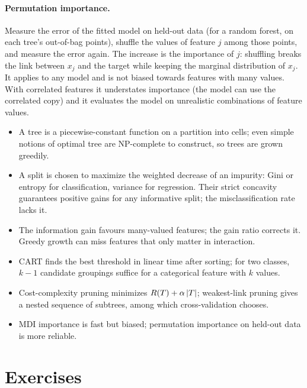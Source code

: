 \begin{notechapter}
\paragraph{Permutation importance.} Measure the error of the fitted model on held-out
data (for a random forest, on each tree's out-of-bag points), shuffle the values of
feature $j$ among those points, and measure the error again. The increase is the
importance of $j$: shuffling breaks the link between $x_j$ and the target while keeping the
marginal distribution of $x_j$. It applies to any model and is not biased towards
features with many values. With correlated features it understates importance (the
model can use the correlated copy) and it evaluates the model on unrealistic
combinations of feature values.

\begin{chaptersummary}
\begin{itemize}[nosep]
  \item A tree is a piecewise-constant function on a partition into cells; even simple notions of
        optimal tree are NP-complete to construct, so trees are grown greedily.
  \item A split is chosen to maximize the weighted decrease of an impurity: Gini or entropy
        for classification, variance for regression. Their strict concavity guarantees
        positive gains for any informative split; the misclassification rate lacks it.
  \item The information gain favours many-valued features; the gain ratio corrects it.
        Greedy growth can miss features that only matter in interaction.
  \item CART finds the best threshold in linear time after sorting; for two classes, $k - 1$
        candidate groupings suffice for a categorical feature with $k$ values.
  \item Cost-complexity pruning minimizes $R(T) + \alpha\left|T\right|$; weakest-link pruning gives a nested
        sequence of subtrees, among which cross-validation chooses.
  \item MDI importance is fast but biased; permutation importance on held-out data is
        more reliable.
\end{itemize}
\end{chaptersummary}

\section*{Exercises}


\end{notechapter}
